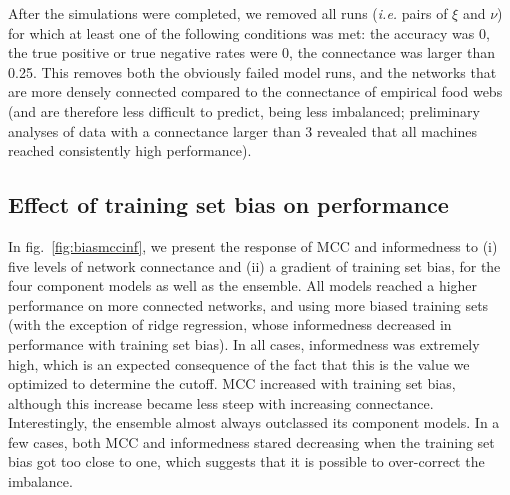 \documentclass[10pt,oneside]{article}
\begin{document}
After the simulations were completed, we removed all runs (\emph{i.e.}
pairs of \(\xi\) and \(\nu\)) for which at least one of the following
conditions was met: the accuracy was 0, the true positive or true
negative rates were 0, the connectance was larger than 0.25. This
removes both the obviously failed model runs, and the networks that are
more densely connected compared to the connectance of empirical food
webs (and are therefore less difficult to predict, being less
imbalanced; preliminary analyses of data with a connectance larger than
3 revealed that all machines reached consistently high performance).

\hypertarget{effect-of-training-set-bias-on-performance}{%
\subsection{Effect of training set bias on
performance}\label{effect-of-training-set-bias-on-performance}}

In fig.~\ref{fig:biasmccinf}, we present the response of MCC and
informedness to (i) five levels of network connectance and (ii) a
gradient of training set bias, for the four component models as well as
the ensemble. All models reached a higher performance on more connected
networks, and using more biased training sets (with the exception of
ridge regression, whose informedness decreased in performance with
training set bias). In all cases, informedness was extremely high, which
is an expected consequence of the fact that this is the value we
optimized to determine the cutoff. MCC increased with training set bias,
although this increase became less steep with increasing connectance.
Interestingly, the ensemble almost always outclassed its component
models. In a few cases, both MCC and informedness stared decreasing when
the training set bias got too close to one, which suggests that it is
possible to over-correct the imbalance.
\end{document}
